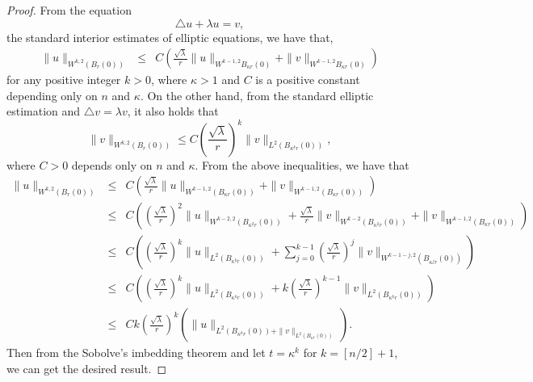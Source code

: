 \documentclass[a4paper, 12pt, onecolumn]{article} \textwidth 148mm
\begin{document}
\begin{proof}
From the equation $$\triangle u+\lambda u=v,$$ the standard interior estimates of elliptic equations, we have that,
\begin{eqnarray*}
\|u\|_{W^{k,2}(B_r(0))}
&\leq&C\left(\frac{\sqrt{\lambda}}{r}\|u\|_{W^{k-1,2}B_{\kappa r}(0)}+\|v\|_{W^{k-1,2}B_{\kappa r}(0)}\right)
\end{eqnarray*}
for any positive integer $k>0$, where $\kappa>1$  and $C$ is a positive constant depending only on $n$ and $\kappa$.
On the other hand, from the standard elliptic estimation and $\triangle v=\lambda v$, it also holds that
\begin{equation*}
\|v\|_{W^{k,2}(B_{r}(0))}\leq C\left(\frac{\sqrt{\lambda}}{r}\right)^{k}\|v\|_{L^2(B_{\kappa^kr}(0))},
\end{equation*}
where $C>0$ depends only on $n$ and $\kappa$.
From the above inequalities, we have that
\begin{eqnarray*}
\|u\|_{W^{k,2}(B_r(0))}
&\leq&C\left(\frac{\sqrt{\lambda}}{r}\|u\|_{W^{k-1,2}(B_{\kappa r}(0))}+\|v\|_{W^{k-1,2}(B_{\kappa r}(0))}\right)
\\&\leq&C\left(\left(\frac{\sqrt{\lambda}}{r}\right)^2\|u\|_{W^{k-2,2}(B_{\kappa^2 r}(0))}+\frac{\sqrt{\lambda}}{r}\|v\|_{W^{k-2}(B_{\kappa^2 r}(0))}+\|v\|_{W^{k-1,2}(B_{\kappa r}(0))}\right)
\\&\leq&C\left(\left(\frac{\sqrt{\lambda}}{r}\right)^k\|u\|_{L^2(B_{\kappa^kr}(0))}
+\sum\limits_{j=0}^{k-1}\left(\frac{\sqrt{\lambda}}{r}\right)^j\|v\|_{W^{k-1-j,2}(B_{\kappa^jr}(0))}\right)
\\&\leq&C\left(\left(\frac{\sqrt{\lambda}}{r}\right)^{k}\|u\|_{L^2(B_{\kappa^kr}(0))}
+k\left(\frac{\sqrt{\lambda}}{r}\right)^{k-1}\|v\|_{L^2(B_{\kappa^kr}(0))}\right)
\\&\leq&Ck\left(\frac{\sqrt{\lambda}}{r}\right)^k\left(\|u\|_{L^2(B_{\kappa^kr}(0))+\|v\|_{L^2(B_{\kappa^k}(0))}}\right).
\end{eqnarray*}
Then from the Sobolve's imbedding theorem and let $t=\kappa^k$ for $k=[n/2]+1$, we can get the desired result.
\end{proof}
\end{document}
